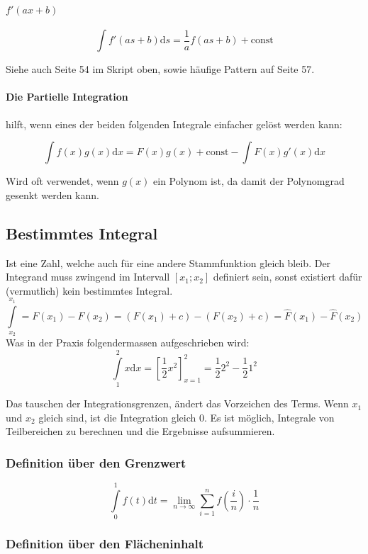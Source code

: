 \paragraph{$f'(ax+b)$}
\[
	\int f'(as + b) \mathrm{d}s = \frac{1}{a}f(as + b) + \mathrm{const}
\]

Siehe auch Seite 54 im Skript oben, sowie häufige Pattern auf Seite 57.

\paragraph{Die Partielle Integration}
hilft, wenn eines der beiden folgenden Integrale einfacher gelöst werden kann:

\[
	\int{f(x) g(x)} \mathrm{d}x = F(x) g(x) + \mathrm{const} - \int{F(x) g'(x) }\mathrm{d}x
\]

Wird oft verwendet, wenn $g(x)$ ein Polynom ist, da damit der Polynomgrad gesenkt werden kann.

\subsection{Bestimmtes Integral}

Ist eine Zahl, welche auch für eine andere Stammfunktion gleich bleib. Der Integrand muss zwingend im Intervall $[x_1; x_2]$ definiert sein, sonst existiert dafür (vermutlich) kein bestimmtes Integral.
\[
\int\limits^{x_1}_{x_2} = F(x_1) - F(x_2) = (F(x_1) + c) - (F(x_2) + c) = \hat{F}(x_1) - \hat{F}(x_2)
\]
Was in der Praxis folgendermassen aufgeschrieben wird:
\[
	\int\limits^2_1 x \mathrm{ d}x = \left[ \frac{1}{2} x^2 \right]^2_{x=1} = \frac{1}{2} 2^2 - \frac{1}{2} 1^2
\]

Das tauschen der Integrationsgrenzen, ändert das Vorzeichen des Terms. Wenn $x_1$ und $x_2$ gleich sind, ist die Integration gleich $0$. Es ist möglich, Integrale von Teilbereichen zu berechnen und die Ergebnisse aufsummieren.

\subsubsection{Definition über den Grenzwert}

\[
 \int\limits^1_0{f(t)\mathrm{d}t} = \lim_{n \to \infty} \sum^n_{i=1}{f(\frac{i}{n}) \cdot \frac{1}{n}}
\]

\subsubsection{Definition über den Flächeninhalt}

